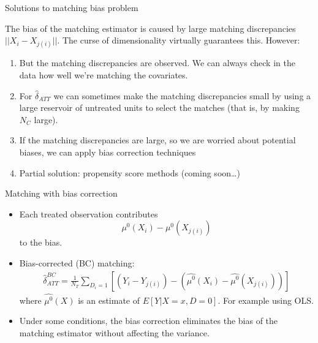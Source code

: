 \documentclass{beamer}
\begin{document}
\begin{frame}{Solutions to matching bias problem}
	
The bias of the matching estimator is caused by large matching discrepancies $||X_i - X_{j(i)}||$. The curse of dimensionality virtually guarantees this.  However:
	\begin{enumerate}
	\item But the matching discrepancies are observed. We can always check in the data how well we're matching the covariates.

	\item For $\widehat{\delta}_{ATT}$ we can sometimes make the matching discrepancies small by using a large reservoir of untreated units to select the matches (that is, by making $N_C$ large).

  \item If the matching discrepancies are large, so we are worried about potential biases, we can apply bias correction techniques

  \item Partial solution: propensity score methods (coming soon\dots)
	\end{enumerate}
\end{frame}

\begin{frame}{Matching with bias correction}
	
	\begin{itemize}
	\item Each treated observation contributes$$\mu^0(X_i) - \mu^0(X_{j(i)})$$to the bias.
	\item Bias-corrected (BC) matching:
		\begin{eqnarray*}
		\widehat{\delta}_{ATT}^{BC} = \frac{1}{N_T} \sum_{D_i=1} \left[ (Y_i - Y_{j(i)}) - ( \widehat{\mu^0}(X_i) - \widehat{\mu^0}(X_{j(i)}) ) \right]
		\end{eqnarray*}where $\widehat{\mu^0}(X)$ is an estimate of $E[Y|X=x,D=0]$.  For example using OLS.  
	\item Under some conditions, the bias correction eliminates the bias of the matching estimator without affecting the variance.
	\end{itemize}
\end{frame}
\end{document}
